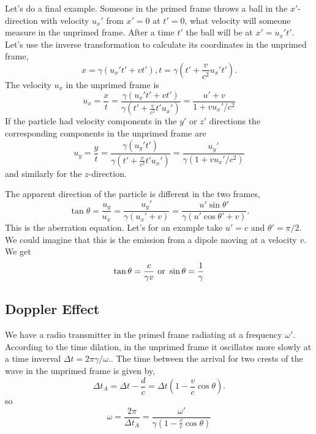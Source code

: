 Let's do a final example.  Someone in the primed frame throws a ball
in the $x'$-direction with velocity $u_x'$ from $x'=0$ at $t'=0$, what
velocity will someone measure in the unprimed frame.  After a time
$t'$ the ball will be at $x'=u_x' t'$.  Let's use the inverse
transformation to calculate its coordinates in the unprimed frame,
\begin{equation}
x = \gamma ( u_x' t' + v t' ), t = \gamma \left ( t' + \frac{v}{c^2} u_x'
t' \right ).
\label{eq:271}
\end{equation}
The velocity $u_x$ in the unprimed frame is
\begin{equation}
u_x = \frac{x}{t} = 
\frac{\gamma ( u_x' t' + v t' )}{\gamma \left ( t' + \frac{v}{c^2} t'
  u_x'\right )} = \frac{ u' + v }{1 + v u_x'/c^2}
\label{eq:272}
\end{equation}
If the particle had velocity components in the $y'$ or $z'$ directions
the corresponding components in the unprimed frame are
\begin{equation}
u_y = \frac{y}{t} = 
\frac{\gamma ( u_y' t' )}{\gamma \left ( t' + \frac{v}{c^2} t'
  u_x'\right )} = \frac{ u_y' }{\gamma ( 1 + v u_x'/c^2 )}
\label{eq:273}
\end{equation}
and similarly for the $z$-direction.

The apparent direction of the particle is different in the two frames,
\begin{equation}
\tan \theta = \frac{u_y}{u_x} = \frac{u_y'}{\gamma ( u_x' + v )} =
\frac{u' \sin\theta'}{\gamma ( u' \cos\theta' + v )}.
\label{eq:274}
\end{equation}
This is the aberration equation.  
Let's for an example take $u'=c$ and $\theta'=\pi/2$.   We could
imagine that this is the emission from a dipole moving at a velocity
$v$.  We get
\begin{equation}
\tan \theta = \frac{c}{\gamma v}~\hbox{\rm or}~\sin\theta = \frac{1}{\gamma}
\label{eq:275}
\end{equation}

\subsection{Doppler Effect}
\label{sec:doppler-effect}
We have a radio transmitter in the primed frame radiating at a
frequency $\omega'$.  According to the time dilation, in the unprimed
frame it oscillates more slowly at a time inverval 
$\Delta t=2\pi \gamma/\omega$.. The
time between the arrival for two crests of the wave in the unprimed
frame is  given by,
\begin{equation}
\Delta t_A = \Delta t - \frac{d}{c} = \Delta t \left (  1 -
\frac{v}{c} \cos\theta \right ).
\label{eq:276}
\end{equation}
so
\begin{equation}
\omega = \frac{2 \pi}{\Delta t_A} = \frac{\omega'}{\gamma \left (  1 -
\frac{v}{c} \cos\theta \right )}
\label{eq:277}
\end{equation}


